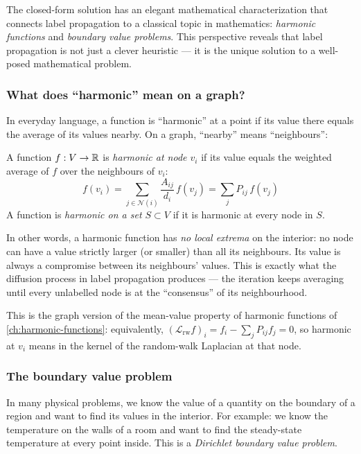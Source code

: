 \begin{notechapter}
The closed-form solution has an elegant mathematical characterization that
connects label propagation to a classical topic in mathematics:
\emph{harmonic functions} and \emph{boundary value problems}. This
perspective reveals that label propagation is not just a clever heuristic --- it
is the unique solution to a well-posed mathematical problem.

\subsubsection*{What does ``harmonic'' mean on a graph?}

In everyday language, a function is ``harmonic'' at a point if its value there
equals the average of its values nearby. On a graph, ``nearby'' means
``neighbours'':

\begin{definition}
\label{semi-supervised-graphs:def:harmonic}
A function $f: V \to \mathbb{R}$ is \emph{harmonic at node $v_i$} if its value
equals the weighted average of $f$ over the neighbours of $v_i$:
\begin{equation}
\label{semi-supervised-graphs:eq:harmonic_condition}
f(v_i) = \sum_{j \in \mathcal{N}(i)} \frac{A_{ij}}{d_i}\,f(v_j)
= \sum_j P_{ij}\,f(v_j)
\end{equation}
A function is \emph{harmonic on a set $S \subset V$} if it is harmonic at
every node in $S$.
\end{definition}

In other words, a harmonic function has \emph{no local extrema} on the
interior: no node can have a value strictly larger (or smaller) than all its
neighbours. Its value is always a compromise between its neighbours' values.
This is exactly what the diffusion process in label propagation produces --- the
iteration keeps averaging until every unlabelled node is at the ``consensus''
of its neighbourhood.

This is the graph version of the mean-value property of harmonic functions of \cref{ch:harmonic-functions}: equivalently, $(\mathcal L_{\mathrm{rw}}f)_i = f_i - \sum_jP_{ij}f_j = 0$, so harmonic at $v_i$ means in the kernel of the random-walk Laplacian at that node.

\subsubsection*{The boundary value problem}

In many physical problems, we know the value of a quantity on the boundary of
a region and want to find its values in the interior. For example: we know
the temperature on the walls of a room and want to find the steady-state
temperature at every point inside. This is a \emph{Dirichlet boundary value
problem}.


\end{notechapter}
